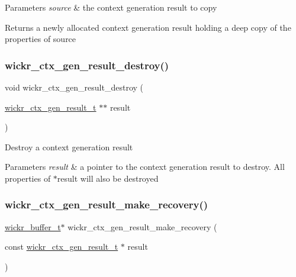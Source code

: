 \begin{DoxyParams}{Parameters}
{\em source} & the context generation result to copy \\
\hline
\end{DoxyParams}
\begin{DoxyReturn}{Returns}
a newly allocated context generation result holding a deep copy of the properties of \textquotesingle{}source\textquotesingle{} 
\end{DoxyReturn}
\mbox{\label{group__wickr__ctx_ga865854408d22e4697eebe5bc129cc6b1}} 
\subsubsection{\texorpdfstring{wickr\+\_\+ctx\+\_\+gen\+\_\+result\+\_\+destroy()}{wickr\_ctx\_gen\_result\_destroy()}}
{\footnotesize\ttfamily void wickr\+\_\+ctx\+\_\+gen\+\_\+result\+\_\+destroy (\begin{DoxyParamCaption}\item[{\hyperlink{structwickr__ctx__gen__result}{wickr\+\_\+ctx\+\_\+gen\+\_\+result\+\_\+t} $\ast$$\ast$}]{result }\end{DoxyParamCaption})}

Destroy a context generation result


\begin{DoxyParams}{Parameters}
{\em result} & a pointer to the context generation result to destroy. All properties of \textquotesingle{}$\ast$result\textquotesingle{} will also be destroyed \\
\hline
\end{DoxyParams}
\mbox{\label{group__wickr__ctx_gaa32727731391f1e3fbde26094924b533}} 
\subsubsection{\texorpdfstring{wickr\+\_\+ctx\+\_\+gen\+\_\+result\+\_\+make\+\_\+recovery()}{wickr\_ctx\_gen\_result\_make\_recovery()}}
{\footnotesize\ttfamily \hyperlink{structwickr__buffer}{wickr\+\_\+buffer\+\_\+t}$\ast$ wickr\+\_\+ctx\+\_\+gen\+\_\+result\+\_\+make\+\_\+recovery (\begin{DoxyParamCaption}\item[{const \hyperlink{structwickr__ctx__gen__result}{wickr\+\_\+ctx\+\_\+gen\+\_\+result\+\_\+t} $\ast$}]{result }\end{DoxyParamCaption})}

